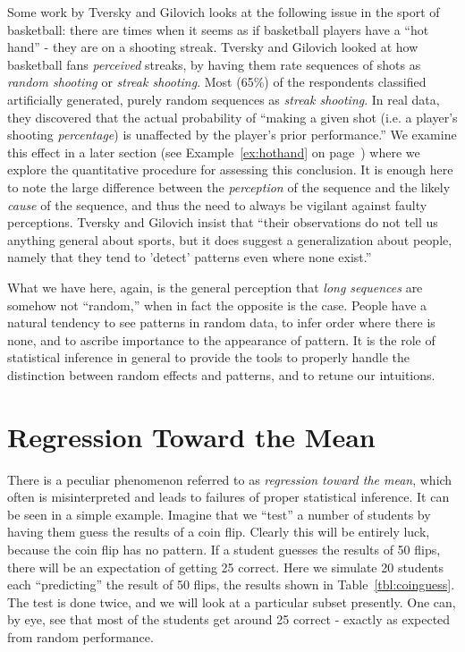 Some work by Tversky and Gilovich\cite{tversky2005cold} looks at the following issue in the sport of basketball:  there are times when it seems as if basketball players have a ``hot hand'' - they are on a shooting streak.  Tversky and Gilovich looked at how basketball fans {\em perceived} streaks, by having them rate sequences of shots as {\em random shooting} or {\em streak shooting}.  Most (65\%) of the respondents classified artificially generated, purely random sequences as {\em streak shooting}.  In real data, they discovered that the actual probability of ``making a given shot (i.e. a player's shooting {\em percentage}) is unaffected by the player's prior performance.''  We examine this effect in a later section (see Example~\ref{ex:hothand} on page~\pageref{ex:hothand}) where we explore the quantitative procedure for assessing this conclusion.  It is enough here to note the large difference between the {\em perception} of the sequence and the likely {\em cause} of the sequence, and thus the need to always be vigilant against faulty perceptions.  Tversky and Gilovich insist that ``their observations do not tell us anything general about sports, but it does suggest a generalization about people, namely that they tend to 'detect' patterns even where none exist.''

What we have here, again, is the general perception that {\em long sequences} are somehow not ``random,'' when in fact the opposite is the case.  People have a natural tendency to see patterns in random data, to infer order where there is none, and to ascribe importance to the appearance of pattern.  It is the role of statistical inference in general to provide the tools to properly handle the distinction between random effects and patterns, and to retune our intuitions.

\section{Regression Toward the Mean}
There is a peculiar phenomenon referred to as {\em regression toward the mean}, which often is misinterpreted and leads to failures of proper statistical inference.  It can be seen in a simple example.  Imagine that we ``test'' a number of students by having them guess the results of a coin flip.  Clearly this will be entirely luck, because the coin flip has no pattern.  If a student guesses the results of 50 flips, there will be an expectation of getting 25 correct.   Here we simulate 20 students each ``predicting'' the result of 50 flips, the results shown in Table~\ref{tbl:coinguess}.  The test is done twice, and we will look at a particular subset presently.  One can, by eye, see that most of the students get around 25 correct - exactly as expected from random performance.

